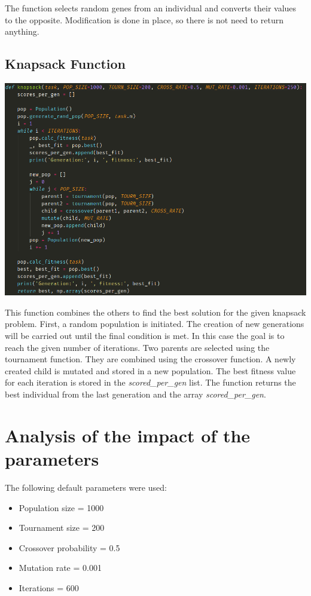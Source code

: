 \documentclass[12pt]{article}
\begin{document}
The function selects random genes from an individual and converts their values to the opposite. Modification is done in place, so there is not need to return anything.

\subsection{Knapsack Function}
\begin{center}
	\hspace*{-1.5cm}
	\includegraphics[scale=0.5]{knapsack}
\end{center}

This function combines the others to find the best solution for the given knapsack problem. First, a random population is initiated. 
The creation of new generations will be carried out until the final condition is met. In this case the goal is to reach the given number of iterations. Two parents are selected using the tournament function. They are combined using the crossover function. A newly created child is mutated and stored in a new population. The best fitness value for each iteration is stored in the \emph{scored\_per\_gen} list. The function returns the best individual from the last generation and the array \emph{scored\_per\_gen}.

\section{Analysis of the impact of the parameters}
The following default parameters were used: 
\begin{itemize}
\item Population size = 1000
\item Tournament size = 200
\item Crossover probability = 0.5
\item Mutation rate = 0.001
\item Iterations = 600
\end{itemize}
\end{document}
